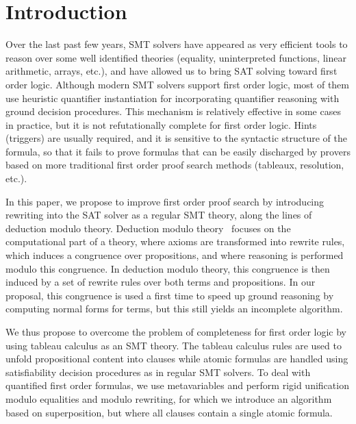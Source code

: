 
\section{Introduction}

Over the last past few
years, SMT solvers have appeared as very efficient tools to reason over some
well identified theories (equality, uninterpreted functions, linear arithmetic,
arrays, etc.), and have allowed us to bring SAT solving toward first order logic.
Although modern SMT solvers support first order logic, most of them use
heuristic quantifier instantiation for incorporating quantifier reasoning with
ground decision procedures. This mechanism is relatively effective in some cases
in practice, but it is not refutationally complete for first order logic. Hints
(triggers) are usually required, and it is sensitive to the syntactic structure
of the formula, so that it fails to prove formulas that can be easily discharged
by provers based on more traditional first order proof search methods (tableaux,
resolution, etc.).

In this paper, we propose to improve first order proof search by introducing
rewriting into the SAT solver as a regular SMT theory, along the lines of
deduction modulo theory. Deduction modulo theory~\cite{DA03} focuses on the
computational part of a theory, where axioms are transformed into rewrite rules,
which induces a congruence over propositions, and where reasoning is performed
modulo this congruence. In deduction modulo theory, this congruence is then
induced by a set of rewrite rules over both terms and propositions. In our
proposal, this congruence is used a first time to speed up ground reasoning
by computing normal forms for terms, but this still yields an incomplete
algorithm.

We thus propose to overcome the problem of completeness for first
order logic by using tableau calculus as an SMT theory. The tableau calculus
rules are used to unfold propositional content into clauses while atomic
formulas are handled using satisfiability decision procedures as in
regular SMT solvers. To deal with quantified first order formulas, we use
metavariables and perform rigid unification modulo equalities and modulo rewriting,
for which we introduce an algorithm based on superposition, but where all clauses
contain a single atomic formula.

